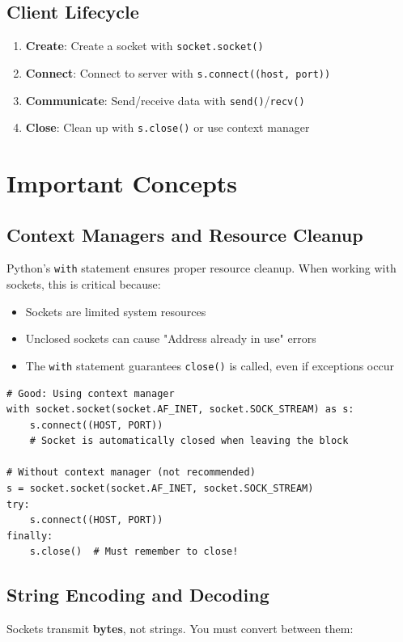 \documentclass[]{article}
\begin{document}
  \subsection{Client Lifecycle}
  \begin{enumerate}
    \item \textbf{Create}: Create a socket with \texttt{socket.socket()}
    \item \textbf{Connect}: Connect to server with \texttt{s.connect((host, port))}
    \item \textbf{Communicate}: Send/receive data with \texttt{send()}/\texttt{recv()}
    \item \textbf{Close}: Clean up with \texttt{s.close()} or use context manager
  \end{enumerate}

  \section{Important Concepts}

  \subsection{Context Managers and Resource Cleanup}
  Python's \texttt{with} statement ensures proper resource cleanup. When working with sockets, this is critical because:
  \begin{itemize}
    \item Sockets are limited system resources
    \item Unclosed sockets can cause "Address already in use" errors
    \item The \texttt{with} statement guarantees \texttt{close()} is called, even if exceptions occur
  \end{itemize}

  \begin{verbatim}
# Good: Using context manager
with socket.socket(socket.AF_INET, socket.SOCK_STREAM) as s:
    s.connect((HOST, PORT))
    # Socket is automatically closed when leaving the block

# Without context manager (not recommended)
s = socket.socket(socket.AF_INET, socket.SOCK_STREAM)
try:
    s.connect((HOST, PORT))
finally:
    s.close()  # Must remember to close!
  \end{verbatim}

  \subsection{String Encoding and Decoding}
  Sockets transmit \textbf{bytes}, not strings. You must convert between them:
\end{document}
